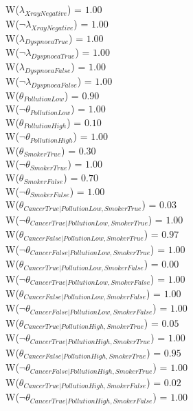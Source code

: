 W($\lambda_{XrayNegative}$) = $1.00$\\ 
W($\neg \lambda_{XrayNegative}$) = $1.00$\\ 
W($\lambda_{DyspnoeaTrue}$) = $1.00$\\ 
W($\neg \lambda_{DyspnoeaTrue}$) = $1.00$\\ 
W($\lambda_{DyspnoeaFalse}$) = $1.00$\\ 
W($\neg \lambda_{DyspnoeaFalse}$) = $1.00$\\ 
W($\theta_{PollutionLow}$) = $0.90$\\ 
W($\neg\theta_{PollutionLow}$) = $1.00$\\ 
W($\theta_{PollutionHigh}$) = $0.10$\\ 
W($\neg\theta_{PollutionHigh}$) = $1.00$\\ 
W($\theta_{SmokerTrue}$) = $0.30$\\ 
W($\neg\theta_{SmokerTrue}$) = $1.00$\\ 
W($\theta_{SmokerFalse}$) = $0.70$\\ 
W($\neg\theta_{SmokerFalse}$) = $1.00$\\ 
W($\theta_{CancerTrue|PollutionLow,SmokerTrue}$) = $0.03$\\ 
W($\neg\theta_{CancerTrue|PollutionLow,SmokerTrue}$) = $1.00$\\ 
W($\theta_{CancerFalse|PollutionLow,SmokerTrue}$) = $0.97$\\ 
W($\neg\theta_{CancerFalse|PollutionLow,SmokerTrue}$) = $1.00$\\ 
W($\theta_{CancerTrue|PollutionLow,SmokerFalse}$) = $0.00$\\ 
W($\neg\theta_{CancerTrue|PollutionLow,SmokerFalse}$) = $1.00$\\ 
W($\theta_{CancerFalse|PollutionLow,SmokerFalse}$) = $1.00$\\ 
W($\neg\theta_{CancerFalse|PollutionLow,SmokerFalse}$) = $1.00$\\ 
W($\theta_{CancerTrue|PollutionHigh,SmokerTrue}$) = $0.05$\\ 
W($\neg\theta_{CancerTrue|PollutionHigh,SmokerTrue}$) = $1.00$\\ 
W($\theta_{CancerFalse|PollutionHigh,SmokerTrue}$) = $0.95$\\ 
W($\neg\theta_{CancerFalse|PollutionHigh,SmokerTrue}$) = $1.00$\\ 
W($\theta_{CancerTrue|PollutionHigh,SmokerFalse}$) = $0.02$\\ 
W($\neg\theta_{CancerTrue|PollutionHigh,SmokerFalse}$) = $1.00$\\ 
